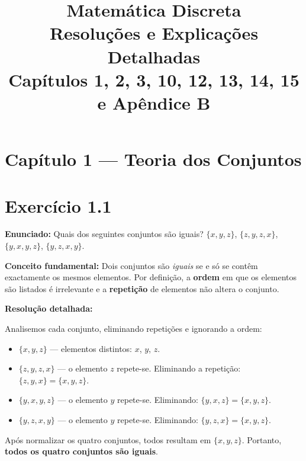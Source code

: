 \documentclass[12pt,a4paper]{article}
\title{%
  \vspace{-1cm}
  {\Large \textbf{Matemática Discreta}}\\[0.4em]
  {\large Resoluções e Explicações Detalhadas}\\[0.3em]
  {\normalsize Capítulos 1, 2, 3, 10, 12, 13, 14, 15 e Apêndice B}
}
\author{}
\date{}
\begin{document}
\maketitle
\thispagestyle{fancy}

\tableofcontents
\newpage

\section*{Capítulo 1 --- Teoria dos Conjuntos}

\section*{Exercício 1.1}

\textbf{Enunciado:} Quais dos seguintes conjuntos são iguais?
$\{x, y, z\}$, $\{z, y, z, x\}$, $\{y, x, y, z\}$, $\{y, z, x, y\}$.

\begin{teoribox}
\textbf{Conceito fundamental:} Dois conjuntos são \emph{iguais} se e só se contêm exactamente os mesmos elementos. Por definição, a \textbf{ordem} em que os elementos são listados é irrelevante e a \textbf{repetição} de elementos não altera o conjunto.
\end{teoribox}

\textbf{Resolução detalhada:}

Analisemos cada conjunto, eliminando repetições e ignorando a ordem:
\begin{itemize}
  \item $\{x, y, z\}$ --- elementos distintos: $x$, $y$, $z$.
  \item $\{z, y, z, x\}$ --- o elemento $z$ repete-se. Eliminando a repetição: $\{z, y, x\} = \{x, y, z\}$.
  \item $\{y, x, y, z\}$ --- o elemento $y$ repete-se. Eliminando: $\{y, x, z\} = \{x, y, z\}$.
  \item $\{y, z, x, y\}$ --- o elemento $y$ repete-se. Eliminando: $\{y, z, x\} = \{x, y, z\}$.
\end{itemize}

Após normalizar os quatro conjuntos, todos resultam em $\{x, y, z\}$. Portanto, \textbf{todos os quatro conjuntos são iguais}.
\end{document}
